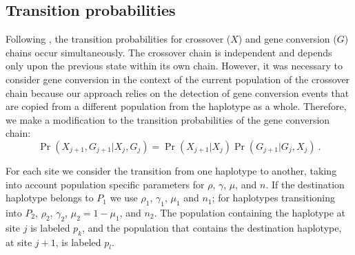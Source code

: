 \subsection{Transition probabilities}
Following \citet{Gay2007}, the transition probabilities for crossover ($X$) and gene conversion ($G$) chains occur simultaneously.
The crossover chain is independent and depends only upon the previous state within its own chain.
However, it was necessary to consider gene conversion in the context of the current population of the crossover chain because our approach relies on the detection of gene conversion events that are copied from a different population from the haplotype as a whole.
Therefore, we make a modification to the transition probabilities of the gene conversion chain:
%
\begin{equation} \Pr(X_{j+1}, G_{j+1} | X_{j},G_{j} ) = \Pr(X_{j+1}|X_{j}) \Pr(G_{j+1}|G_{j},X_{j}) ~. \end{equation}

For each site we consider the transition from one haplotype to another, taking into account population specific parameters for $\rho$, $\gamma$, $\mu$, and $n$.
If the destination haplotype belongs to $P_1$ we use $\rho_1$, $\gamma_1$, $\mu_1$ and $n_1$; for haplotypes transitioning into $P_2$, $\rho_2$, $\gamma_2$, $\mu_2 = 1-\mu_1$, and $n_2$.
The population containing the haplotype at site $j$ is labeled $p_k$, and the population that contains the destination haplotype, at site $j+1$, is labeled $p_l$.


